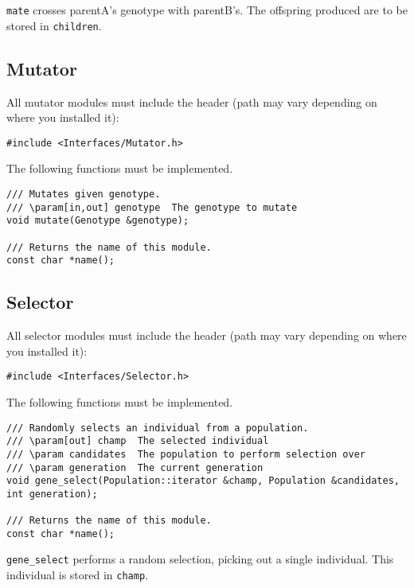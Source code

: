 \noindent\texttt{mate} crosses parentA's genotype with parentB's. The offspring produced are to be stored in \texttt{children}.


\subsection{Mutator}

All mutator modules must include the header (path may vary depending on where you installed it):

\begin{verbatim}
#include <Interfaces/Mutator.h>
\end{verbatim}

\noindent The following functions must be implemented.

\begin{verbatim}
/// Mutates given genotype.
/// \param[in,out] genotype  The genotype to mutate
void mutate(Genotype &genotype);

/// Returns the name of this module.
const char *name();
\end{verbatim}


\subsection{Selector}

All selector modules must include the header (path may vary depending on where you installed it):

\begin{verbatim}
#include <Interfaces/Selector.h>
\end{verbatim}

\noindent The following functions must be implemented.

\begin{verbatim}
/// Randomly selects an individual from a population.
/// \param[out] champ  The selected individual
/// \param candidates  The population to perform selection over
/// \param generation  The current generation
void gene_select(Population::iterator &champ, Population &candidates, int generation);

/// Returns the name of this module.
const char *name();
\end{verbatim}

\noindent\texttt{gene\_select} performs a random selection, picking out a single individual. This individual is stored in \texttt{champ}.
